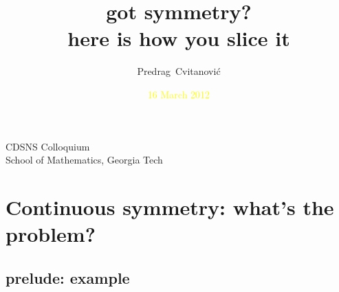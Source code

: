 





                          \date{\textcolor{yellow}{\scriptsize
 16 March 2012
                          }}

\title{got symmetry?
       \\
       {\small here is how you slice it}}
\author[Cvitanovi\'c]
{
  \textcolor{green!50!black}{
  {Predrag~Cvitanovi\'c}
  }
}
\institute
{
CDSNS Colloquium \\
School of Mathematics, Georgia Tech
}



\begin{frame}
  \titlepage
\end{frame}


\section[Das Problem]{Continuous symmetry: what's the problem?}
\subsection[{\cLf} example]{prelude: {\cLf} example}

